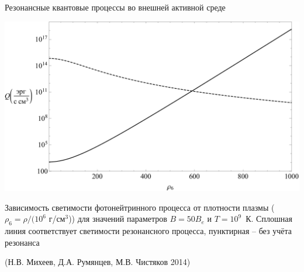 \documentclass{beamer}
\begin{document}
\begin{frame}{Резонансные квантовые процессы во внешней активной среде}
\begin{center}
\includegraphics[scale=0.3]{Qsyn-Qpn 1.pdf}

Зависимость светимости фотонейтринного процесса от плотности плазмы ($\rho_6 = \rho /(10^6$ г/см$^3$)) для значений параметров 
$B=50 B_e$ и $T=10^9$~К. Сплошная линия соответствует светимости резонансного процесса, пунктирная -- без учёта резонанса

(Н.В. Михеев, Д.А. Румянцев, М.В. Чистяков 2014)
\end{center}
\end{frame}
\end{document}
